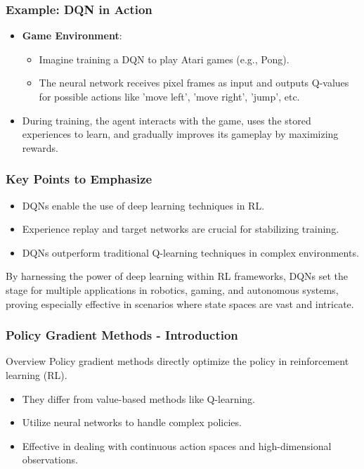 \documentclass[aspectratio=169]{beamer}
\begin{document}
\begin{frame}[fragile]
    \frametitle{Example: DQN in Action}
    \begin{itemize}
        \item \textbf{Game Environment}:
            \begin{itemize}
                \item Imagine training a DQN to play Atari games (e.g., Pong).
                \item The neural network receives pixel frames as input and outputs Q-values for possible actions like 'move left', 'move right', 'jump', etc.
            \end{itemize}
        \item During training, the agent interacts with the game, uses the stored experiences to learn, and gradually improves its gameplay by maximizing rewards.
    \end{itemize}
\end{frame}

\begin{frame}[fragile]
    \frametitle{Key Points to Emphasize}
    \begin{itemize}
        \item DQNs enable the use of deep learning techniques in RL.
        \item Experience replay and target networks are crucial for stabilizing training.
        \item DQNs outperform traditional Q-learning techniques in complex environments.
    \end{itemize}
    By harnessing the power of deep learning within RL frameworks, DQNs set the stage for multiple applications in robotics, gaming, and autonomous systems, 
    proving especially effective in scenarios where state spaces are vast and intricate.
\end{frame}

\begin{frame}[fragile]
    \frametitle{Policy Gradient Methods - Introduction}
    \begin{block}{Overview}
        Policy gradient methods directly optimize the policy in reinforcement learning (RL).
    \end{block}
    \begin{itemize}
        \item They differ from value-based methods like Q-learning.
        \item Utilize neural networks to handle complex policies.
        \item Effective in dealing with continuous action spaces and high-dimensional observations.
    \end{itemize}
\end{frame}
\end{document}
